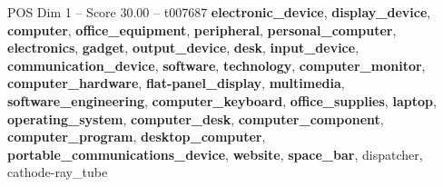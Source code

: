 \begin{textsample}{POS Dim 1 – Score 30.00 – t007687}  \label{ex:f1_pos_015}
\textbf{electronic\_device}, \textbf{display\_device}, \textbf{computer}, \textbf{office\_equipment}, \textbf{peripheral}, \textbf{personal\_computer}, \textbf{electronics}, \textbf{gadget}, \textbf{output\_device}, \textbf{desk}, \textbf{input\_device}, \textbf{communication\_device}, \textbf{software}, \textbf{technology}, \textbf{computer\_monitor}, \textbf{computer\_hardware}, \textbf{flat-panel\_display}, \textbf{multimedia}, \textbf{software\_engineering}, \textbf{computer\_keyboard}, \textbf{office\_supplies}, \textbf{laptop}, \textbf{operating\_system}, \textbf{computer\_desk}, \textbf{computer\_component}, \textbf{computer\_program}, \textbf{desktop\_computer}, \textbf{portable\_communications\_device}, \textbf{website}, \textbf{space\_bar}, dispatcher, cathode-ray\_tube

\end{textsample}
